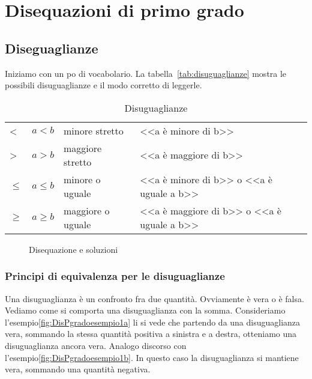\chapter{Disequazioni di primo grado}
\label{cha:DisequazioniDiPrimogrado}
 \section{Diseguaglianze}
\label{sec:Disequglianze}
Iniziamo con un po di vocabolario. La tabella~\vref{tab:disuguaglianze} mostra le possibili disuguaglianze e il modo corretto di  leggerle.
\begin{table}
\centering
\begin{tabular}{lcll}
	\toprule
<&$a<b$&minore stretto&<<a è minore di b>>\\
>&$a>b$&maggiore stretto& <<a è maggiore di b>>\\
$\leq$&$a\leq b$&minore o uguale& <<a è minore di b>> o <<a è uguale a b>> \\
$\geq$&$a\geq b$&maggiore o uguale&<<a è maggiore di b>> o <<a è uguale a b>>\\
\bottomrule
\end{tabular}
\caption{Disuguaglianze}
\label{tab:disuguaglianze}
\end{table}
\begin{figure}
	\centering
{}
	\caption{Disequazione e soluzioni}
	\label{fig:DidequazioniEsoluzioni}
\end{figure}
\subsection{Principi di equivalenza per le disuguaglianze}
\label{sec:PrincipiDiEquvalenzaPerLeDisuguaglianze}
Una disuguaglianza è un confronto fra due quantità. Ovviamente è vera o è falsa. Vediamo come si comporta una disuguaglianza con la somma. Consideriamo l'esempio\nobs\vref{fig:DisPgradoesempio1a} li si vede che partendo da una disuguaglianza vera, sommando la stessa quantità positiva a sinistra e a destra, otteniamo una disuguaglianza ancora vera.  Analogo discorso con l'esempio\nobs\vref{fig:DisPgradoesempio1b}. In questo caso la disuguaglianza si mantiene vera, sommando una quantità negativa. 

